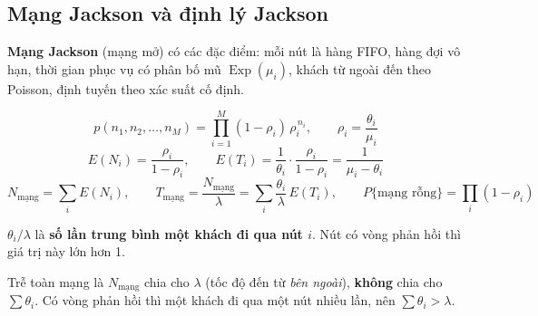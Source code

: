 \subsection{Mạng Jackson và định lý Jackson}

\textbf{Mạng Jackson} (mạng mở) có các đặc điểm: mỗi nút là hàng FIFO, hàng đợi vô hạn, thời gian phục vụ có phân bố mũ $\operatorname{Exp}(\mu_i)$, khách từ ngoài đến theo Poisson, định tuyến theo xác suất cố định.

\begin{congthuc}
\[
p(n_1,n_2,\dots,n_M) = \prod_{i=1}^{M} (1-\rho_i)\,\rho_i^{\,n_i},\qquad \rho_i = \frac{\theta_i}{\mu_i}
\]
\[
E(N_i) = \frac{\rho_i}{1-\rho_i},\qquad E(T_i) = \frac{1}{\theta_i}\cdot\frac{\rho_i}{1-\rho_i} = \frac{1}{\mu_i-\theta_i}
\]
\[
N_{\text{mạng}} = \sum_i E(N_i),\qquad T_{\text{mạng}} = \frac{N_{\text{mạng}}}{\lambda} = \sum_i \frac{\theta_i}{\lambda}\,E(T_i),\qquad P\{\text{mạng rỗng}\} = \prod_i (1-\rho_i)
\]
\end{congthuc}
$\theta_i/\lambda$ là \textbf{số lần trung bình một khách đi qua nút $i$}. Nút có vòng phản hồi thì giá trị này lớn hơn 1.

\begin{luuy}
Trễ toàn mạng là $N_{\text{mạng}}$ chia cho \textbf{$\lambda$} (tốc độ đến từ \emph{bên ngoài}), \textbf{không} chia cho $\sum\theta_i$. Có vòng phản hồi thì một khách đi qua một nút nhiều lần, nên $\sum \theta_i > \lambda$.
\end{luuy}


